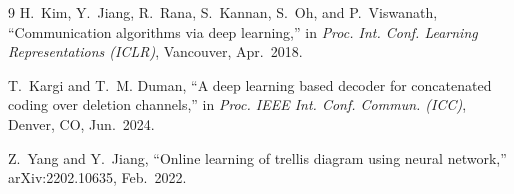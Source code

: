 \documentclass[conference]{IEEEtran}
\begin{document}
\begin{thebibliography}{9}
H.~Kim, Y.~Jiang, R.~Rana, S.~Kannan, S.~Oh, and P.~Viswanath,
``Communication algorithms via deep learning,''
in \emph{Proc. Int. Conf. Learning Representations (ICLR)}, Vancouver,
Apr.~2018.

T.~Kargi and T.~M. Duman,
``A deep learning based decoder for concatenated coding over deletion channels,''
in \emph{Proc. IEEE Int. Conf. Commun. (ICC)}, Denver, CO, Jun.~2024.

Z.~Yang and Y.~Jiang,
``Online learning of trellis diagram using neural network,''
arXiv:2202.10635, Feb.~2022.

\end{thebibliography}

\end{document}
